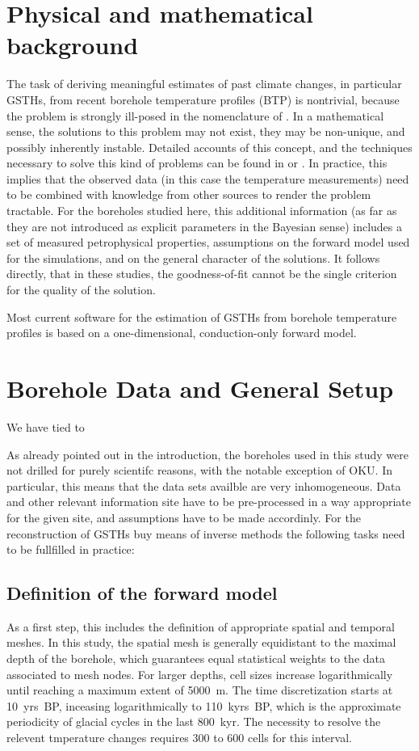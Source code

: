 \documentclass[cp]{copernicus}
\begin{document}
\section{Physical and mathematical background}

The task of deriving meaningful estimates of past climate changes, in particular GSTHs, from recent 
borehole temperature profiles (BTP) is nontrivial, because the problem is strongly ill-posed in the 
nomenclature of \citet{Hadamard1923a}. In a mathematical sense, the solutions to this problem may 
not exist, they may be non-unique, and possibly inherently instable. Detailed accounts of this 
concept, and the techniques necessary to solve this kind of problems can be found in 
\citep{Hansen1998a,Hansen2010a} or \citep{Aster2013a}. In practice, this implies that the observed 
data (in this case the temperature measurements) need to be combined with knowledge from other 
sources to render the problem tractable. For the boreholes studied here, this additional information 
(as far as they are not introduced as explicit parameters in the Bayesian sense) includes a set of 
measured petrophysical properties, assumptions on the forward model used for the simulations, and on 
the general character of the solutions. It follows directly, that in these studies, the 
goodness-of-fit cannot be the single criterion for the quality of the solution. 

Most current software for the estimation of GSTHs from borehole temperature profiles is based on a 
one-dimensional, conduction-only forward model.

\section{Borehole Data and General Setup}
\label{sec:setup}

We have tied to 

As already pointed out in the introduction, the boreholes used in this study were not drilled for 
purely scientifc reasons, with the notable exception of  OKU. In particular, this means that the 
data sets availble are very inhomogeneous. Data and other relevant information site have to be 
pre-processed in a way appropriate for the given site, and assumptions have to be made accordinly. 
For the reconstruction of GSTHs buy means of inverse methods the following tasks need to be 
fullfilled in practice:

\subsection{Definition of the forward model}
As a first step, this includes the definition of appropriate spatial and temporal meshes. In this 
study, the spatial mesh is generally equidistant to the maximal depth  of the borehole, which 
guarantees equal statistical weights to the data associated to mesh nodes. For larger depths, cell 
sizes increase logarithmically until reaching a maximum extent of 5000~m. The time discretization 
starts at 10~yrs~BP, inceasing logarithmically to 110~kyrs~BP, which is the approximate periodicity
of glacial cycles in the last 800~kyr. The necessity to resolve the relevent tmperature changes 
requires 300 to 600 cells for this interval. 
\end{document}
